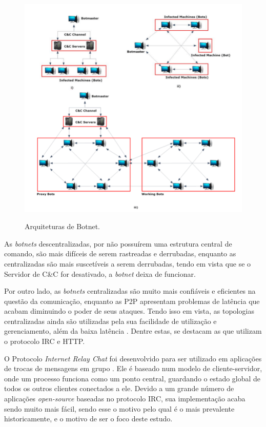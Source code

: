 \begin{figure}[h]
\caption{\small Arquiteturas de Botnet.}
\centering
\includegraphics[scale=0.5]{figs/topologias.png}
\label{f.topologias}
\end{figure}

As \textit{botnets} descentralizadas, por não possuírem uma estrutura central de comando, são mais difíceis de serem rastreadas e derrubadas, enquanto as centralizadas são mais suscetíveis a serem derrubadas, tendo em vista que se o Servidor de C\&C for desativado, a \textit{botnet} deixa de funcionar. \cite{feily2009survey}

Por outro lado, as \textit{botnets} centralizadas são muito mais confiáveis e eficientes na questão da comunicação, enquanto as P2P apresentam problemas de latência que acabam diminuindo o poder de seus ataques. Tendo isso em vista, as topologias centralizadas ainda são utilizadas pela sua facilidade de utilização e gerenciamento, além da baixa latência \cite{12d2f5d1eba245f7bc2acc7487941bd7}. Dentre estas, se destacam as que utilizam o protocolo IRC e HTTP.

O Protocolo \textit{Internet Relay Chat} foi desenvolvido para ser utilizado em aplicações de trocas de mensagens em grupo \cite{oikarinen1993internet}. Ele é baseado num modelo de cliente-servidor, onde um processo funciona como um ponto central, guardando o estado global de todos os outros clientes conectados a ele. Devido a um grande número de aplicações \textit{open-source} baseadas no protocolo IRC, sua implementação acaba sendo muito mais fácil, sendo esse o motivo pelo qual é o mais prevalente historicamente, e o motivo de ser o foco deste estudo. \cite{abu2006multifaceted}

